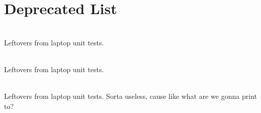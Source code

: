 \chapter{Deprecated List}
\hypertarget{deprecated}{}\label{deprecated}

\begin{DoxyRefList}
\item[Global \doxylink{rb__tree_8c_aa02803c2713094e61fa50807fa7a5116}{rb\+Check\+Black\+Height} (rbtree \texorpdfstring{$\ast$}{*}rbt)]\hfill \\
\label{deprecated__deprecated000003}%
%
Leftovers from laptop unit tests. 
\item[Global \doxylink{rb__tree_8c_a0eb9842e366817eb18eac0e319fb04db}{rb\+Check\+Order} (rbtree \texorpdfstring{$\ast$}{*}rbt, void \texorpdfstring{$\ast$}{*}min, void \texorpdfstring{$\ast$}{*}max)]\hfill \\
\label{deprecated__deprecated000002}%
%
Leftovers from laptop unit tests. 
\item[Global \doxylink{rb__tree_8c_a447d21f412285d3455356d2975a6ced3}{rb\+Print} (rbtree \texorpdfstring{$\ast$}{*}rbt, void(\texorpdfstring{$\ast$}{*}print\+\_\+func)(void \texorpdfstring{$\ast$}{*}))]\hfill \\
\label{deprecated__deprecated000001}%
%
Leftovers from laptop unit tests. Sorta useless, cause like what are we gonna print to?  
\item[Global \doxylink{uvfr__settings_8c_a8e128ab49bfb636a4597802418066784}{uv\+Force\+Default\+Reversion\+Upon\+Device\+Reset} ()]\hfill \\
\label{deprecated__deprecated000004}%
%

\end{DoxyRefList}
